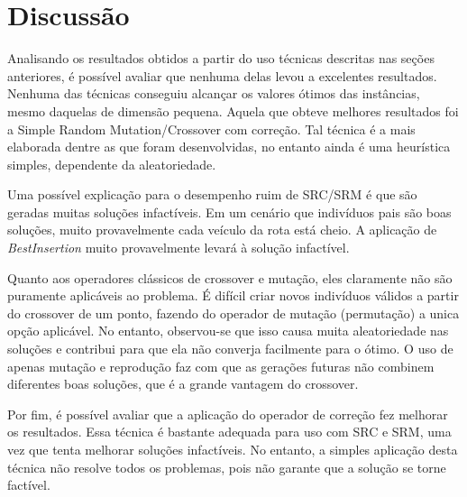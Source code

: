 \documentclass[conference]{IEEEtran}
\begin{document}
\section{Discussão}
Analisando os resultados obtidos a partir do uso técnicas descritas nas seções anteriores, é possível avaliar que nenhuma delas levou a excelentes resultados. Nenhuma das técnicas conseguiu alcançar os valores ótimos das instâncias, mesmo daquelas de dimensão pequena.
Aquela que obteve melhores resultados foi a Simple Random Mutation/Crossover com correção. Tal técnica é a mais elaborada dentre as que foram desenvolvidas, no entanto ainda é uma heurística simples, dependente da aleatoriedade. 

Uma possível explicação para o desempenho ruim de SRC/SRM é que são geradas muitas soluções infactíveis. Em um cenário que indivíduos pais são boas soluções, muito provavelmente cada veículo da rota está cheio. A aplicação de \textit{BestInsertion} muito provavelmente levará à solução infactível. 

Quanto aos operadores clássicos de crossover e mutação, eles claramente não são puramente aplicáveis ao problema. É difícil criar novos indivíduos válidos a partir do crossover de um ponto, fazendo do operador de mutação (permutação) a unica opção aplicável. No entanto, observou-se que isso causa muita aleatoriedade nas soluções e contribui para que ela não converja facilmente para o ótimo. O uso de apenas mutação e reprodução faz com que as gerações futuras não combinem diferentes boas soluções, que é a grande vantagem do crossover.

Por fim, é possível avaliar que a aplicação do operador de correção fez melhorar os resultados. Essa técnica é bastante adequada para uso com SRC e SRM, uma vez que tenta melhorar soluções infactíveis. No entanto, a simples aplicação desta técnica não resolve todos os problemas, pois não garante que a solução se torne factível.

%
\IEEEpeerreviewmaketitle
\end{document}
